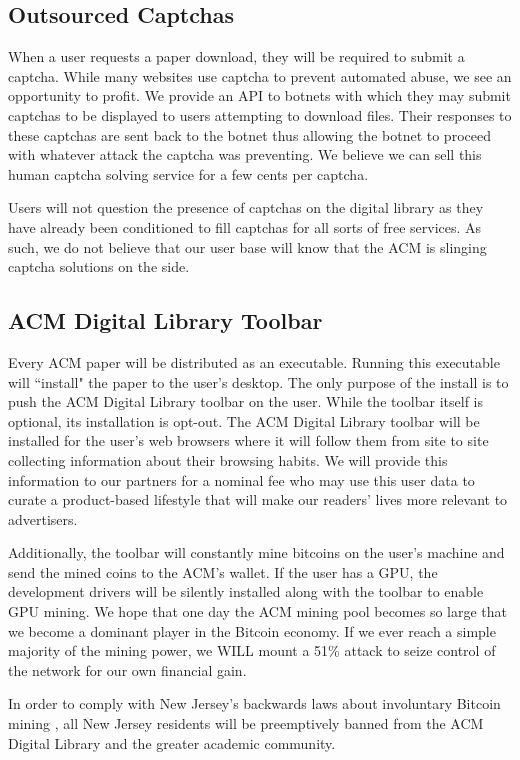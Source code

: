 \subsection{Outsourced Captchas}
When a user requests a paper download, they will be required to submit a
captcha.
While many websites use captcha to prevent automated abuse, we see an
opportunity to profit.
We provide an API to botnets with which they may submit captchas to be
displayed to users attempting to download files.
Their responses to these captchas are sent back to the botnet thus allowing the
botnet to proceed with whatever attack the captcha was preventing.
We believe we can sell this human captcha solving service for a few cents per
captcha.

Users will not question the presence of captchas on the digital
library as they have already been conditioned to fill captchas for all sorts of
free services.
As such, we do not believe that our user base will know that the ACM is
slinging captcha solutions on the side.

\subsection{ACM Digital Library Toolbar}
Every ACM paper will be distributed as an executable.
Running this executable will ``install" the paper to the user's desktop.
The only purpose of the install is to push the ACM Digital Library toolbar on
the user.
While the toolbar itself is optional, its installation is opt-out.
The ACM Digital Library toolbar will be installed for the user's web browsers where it
will follow them from site to site collecting information about their browsing
habits.
We will provide this information to our partners for a nominal fee who may use
this user data to curate a product-based lifestyle that will make our readers' lives
more relevant to advertisers.

Additionally, the toolbar will constantly mine bitcoins on the user's machine
and send the mined coins to the ACM's wallet.
If the user has a GPU, the development drivers will be silently installed along
with the toolbar to enable GPU mining.
We hope that one day the ACM mining pool becomes so large that we become a
dominant player in the Bitcoin economy.
If we ever reach a simple majority of the mining power, we WILL mount a 51\%
attack to seize control of the network for our own financial gain.

In order to comply with New Jersey's backwards laws about involuntary Bitcoin
mining \cite{tidbit}, all New Jersey residents will be preemptively banned from
the ACM Digital Library and the greater academic community.

